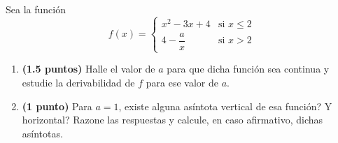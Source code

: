 
Sea la función
\[
f(x)=\begin{cases}x^2-3x+4&\text{si }x\leq2\\[0.8em]4-\dfrac{a}{x}&\text{si }x>2\end{cases}
\]
\begin{enumerate}[label=\alph*)]
\item \textbf{(1.5 puntos)} Halle el valor de $a$ para que dicha función sea continua y estudie la derivabilidad de $f$ para ese valor de $a$.
\item \textbf{(1 punto)} Para $a=1$, \textquestiondown{}existe alguna asíntota vertical de esa función? \textquestiondown{}Y horizontal? Razone las respuestas y calcule, en caso afirmativo, dichas asíntotas.
\end{enumerate}
